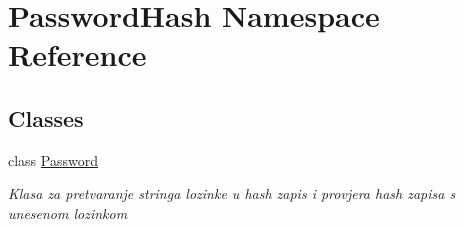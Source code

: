 \hypertarget{namespace_password_hash}{}\section{Password\+Hash Namespace Reference}
\label{namespace_password_hash}
\subsection*{Classes}
\begin{DoxyCompactItemize}
\item 
class \mbox{\hyperlink{class_password_hash_1_1_password}{Password}}
\begin{DoxyCompactList}\small\item\em Klasa za pretvaranje stringa lozinke u hash zapis i provjera hash zapisa s unesenom lozinkom \end{DoxyCompactList}\end{DoxyCompactItemize}
